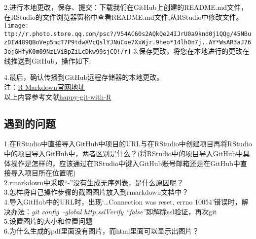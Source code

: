 \documentclass[
]{ctexart}
\begin{document}
2.进行本地更改，保存、提交：下载我们在GitHub上创建的README.md文件，在RStudio的文件浏览器窗格中查看README.md文件,从RStudio中修改文件。\\
\texttt{[image: ttp://r.photo.store.qq.com/psc?/V54AC60s2AQkQe24IJrU0a9knd0j1QQg/45NBuzDIW489QBoVep5mcT7P9tdwXVcQslYJNuCoe7XxWjr.9heo*14lh0n7j..AY*WsAR3aJ763ojGHfyK0m09NzLViBpZiLcDkw99sjCQ!/r]}
3.保存更改，将您在本地进行的更改在线推送到GitHub，操作如下:

4.最后，确认传播到GitHub远程存储器的本地更改。\\
注：\href{http://rmarkdown.rstudio.com}{R Markdown官网地址}\\
以上内容参考文献\href{https://happygitwithr.com/}{happy-git-with-R}

\hypertarget{ux9047ux5230ux7684ux95eeux9898}{%
\subsection{遇到的问题}\label{ux9047ux5230ux7684ux95eeux9898}}

1.在RStudio中直接导入GitHub中项目的URL与在RStudio中创建项目再将RStudio中的项目导入GitHub中，两者区别是什么？(将RStudio中的项目导入GitHub中具体操作是怎样的，应该通过在RStudio中键入GitHub账号邮箱还是在GitHub中直接导入项目所在位置呢)\\
2.rmarkdown中采取``-''没有生成无序列表，是什么原因呢？\\
3.怎样将自己操作步骤的截图图片放入到rmarkdown文档中？\\
4.导入GitHub中的URL时，出现`\ldots Connection was reset, errno
10054'错误时，解决办法：\emph{git config --global http.sslVerify
``false''}即解除ssl验证，再次git\\
5.设置图片的大小和位置问题\\
6.为什么生成的pdf里面没有图片，而html里面可以显示出图片？
\end{document}
